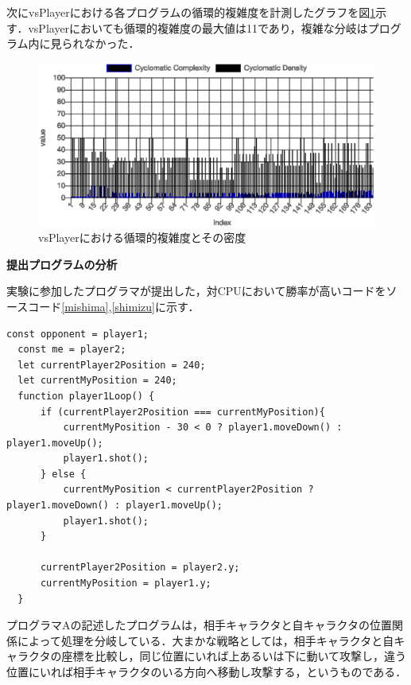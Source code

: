 次にvsPlayerにおける各プログラムの循環的複雑度を計測したグラフを図\ref{vsPlayer_complexity}示す．vsPlayerにおいても循環的複雑度の最大値は11であり，複雑な分岐はプログラム内に見られなかった．

\begin{figure}[!htb]
  \begin{center}
    \includegraphics[width=1.0\linewidth]{image/vsPlayer_cyclomatic.eps}
  \end{center}
    \vspace{-8mm} 
  \caption{vsPlayerにおける循環的複雑度とその密度}
  \label{vsPlayer_complexity}
\end{figure}

\vspace{10truept}
\noindent
{\bf 提出プログラムの分析}

実験に参加したプログラマが提出した，対CPUにおいて勝率が高いコードをソースコード\ref{mishima},\ref{shimizu}に示す．

\begin{lstlisting}[caption=プログラマA, label=mishima]
  const opponent = player1;
  const me = player2;
  let currentPlayer2Position = 240;
  let currentMyPosition = 240;
  function player1Loop() {
      if (currentPlayer2Position === currentMyPosition){
          currentMyPosition - 30 < 0 ? player1.moveDown() : player1.moveUp();
          player1.shot();
      } else {
          currentMyPosition < currentPlayer2Position ? player1.moveDown() : player1.moveUp();
          player1.shot();
      }
      
      currentPlayer2Position = player2.y;
      currentMyPosition = player1.y;
  }
\end{lstlisting}

プログラマAの記述したプログラムは，相手キャラクタと自キャラクタの位置関係によって処理を分岐している．大まかな戦略としては，相手キャラクタと自キャラクタの座標を比較し，同じ位置にいれば上あるいは下に動いて攻撃し，違う位置にいれば相手キャラクタのいる方向へ移動し攻撃する，というものである．

